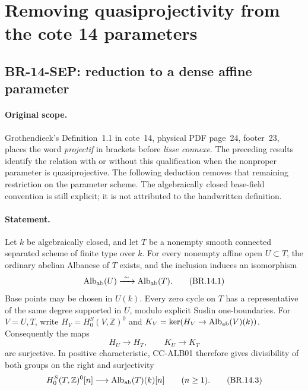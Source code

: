 \section{Removing quasiprojectivity from the cote 14 parameters}

\subsection{BR-14-SEP: reduction to a dense affine parameter}

\paragraph{Original scope.}
Grothendieck's Definition~1.1 in cote~14, physical PDF page~24,
footer~23, places the word \emph{projectif} in brackets before
\emph{lisse connexe}.  The preceding results identify the relation
with or without this qualification when the nonproper parameter is
quasiprojective.  The following deduction removes that remaining
restriction on the parameter scheme.  The algebraically closed
base-field convention is still explicit; it is not attributed to
the handwritten definition.

\paragraph{Statement.}
Let \(k\) be algebraically closed, and let \(T\) be a nonempty smooth
connected separated scheme of finite type over \(k\).  For every
nonempty affine open \(U\subset T\), the ordinary abelian Albanese
of \(T\) exists, and the inclusion induces an isomorphism
\[
              \operatorname{Alb}_{\rm ab}(U)
                    \xrightarrow{\ \sim\ }
              \operatorname{Alb}_{\rm ab}(T).                 \tag{BR.14.1}
\]
Base points may be chosen in \(U(k)\).  Every zero cycle on \(T\)
has a representative of the same degree supported in \(U\), modulo
explicit Suslin one-boundaries.  For \(V=U,T\), write
\(H_V=H^S_0(V,\mathbb Z)^0\) and
\(K_V=\ker(H_V\to\operatorname{Alb}_{\rm ab}(V)(k))\).
Consequently the maps
\[
                    H_U\longrightarrow H_T,\qquad
                    K_U\longrightarrow K_T                  \tag{BR.14.2}
\]
are surjective.  In positive characteristic, CC-ALB01 therefore
gives divisibility of both groups on the right and surjectivity
\[
 H^S_0(T,\mathbb Z)^0[n]\longrightarrow
                    \operatorname{Alb}_{\rm ab}(T)(k)[n]
              \qquad(n\ge1).                                 \tag{BR.14.3}
\]

